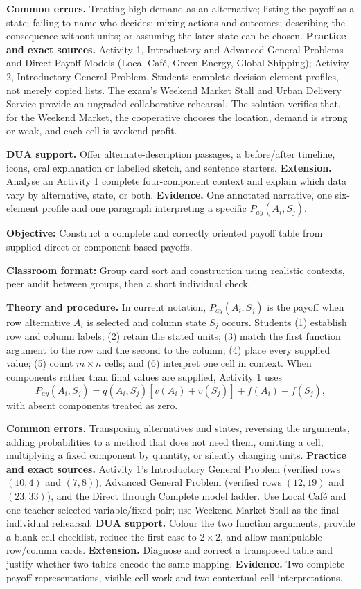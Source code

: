 \documentclass[10pt,letterpaper]{article}
\newcommand{\labelled}[2]{\textbf{#1:} #2\par}
\newcommand{\partheading}[1]{\Needspace{7\baselineskip}\par\vspace{4pt}{\bfseries #1\par}}
\begin{document}
\textbf{Common errors.} Treating high demand as an alternative; listing the
payoff as a state; failing to name who decides; mixing actions and outcomes;
describing the consequence without units; or assuming the later state can be
chosen. \textbf{Practice and exact sources.} Activity 1, Introductory and
Advanced General Problems and Direct Payoff Models (Local Caf\'e, Green Energy,
Global Shipping); Activity 2, Introductory General Problem. Students complete
decision-element profiles, not merely copied lists. The exam's Weekend Market
Stall and Urban Delivery Service provide an ungraded collaborative rehearsal.
The solution verifies that, for the Weekend Market, the cooperative chooses
the location, demand is strong or weak, and each cell is weekend profit.

\textbf{DUA support.} Offer alternate-description passages, a before/after
timeline, icons, oral explanation or labelled sketch, and sentence starters.
\textbf{Extension.} Analyse an Activity 1 complete four-component context and
explain which data vary by alternative, state, or both. \textbf{Evidence.} One
annotated narrative, one six-element profile and one paragraph interpreting a
specific $P_{ay}(A_i,S_j)$.

\partheading{Part 2---C2: Organise Supplied Payoffs}
\labelled{Objective}{Construct a complete and correctly oriented payoff table from supplied direct or component-based payoffs.}
\labelled{Classroom format}{Group card sort and construction using realistic contexts, peer audit between groups, then a short individual check.}
\textbf{Theory and procedure.} In current notation, $P_{ay}(A_i,S_j)$ is the
payoff when row alternative $A_i$ is selected and column state $S_j$ occurs.
Students (1) establish row and column labels; (2) retain the stated units;
(3) match the first function argument to the row and the second to the column;
(4) place every supplied value; (5) count $m\times n$ cells; and (6) interpret
one cell in context. When components rather than final values are supplied,
Activity 1 uses
\[
P_{ay}(A_i,S_j)=q(A_i,S_j)[v(A_i)+v(S_j)]+f(A_i)+f(S_j),
\]
with absent components treated as zero.

\textbf{Common errors.} Transposing alternatives and states, reversing the
arguments, adding probabilities to a method that does not need them, omitting
a cell, multiplying a fixed component by quantity, or silently changing units.
\textbf{Practice and exact sources.} Activity 1's Introductory General Problem
(verified rows $(10,4)$ and $(7,8)$), Advanced General Problem (verified rows
$(12,19)$ and $(23,33)$), and the Direct through Complete model ladder. Use
Local Caf\'e and one teacher-selected variable/fixed pair; use Weekend Market
Stall as the final individual rehearsal. \textbf{DUA support.} Colour the two
function arguments, provide a blank cell checklist, reduce the first case to
$2\times2$, and allow manipulable row/column cards. \textbf{Extension.} Diagnose
and correct a transposed table and justify whether two tables encode the same
mapping. \textbf{Evidence.} Two complete payoff representations, visible cell
work and two contextual cell interpretations.
\end{document}
